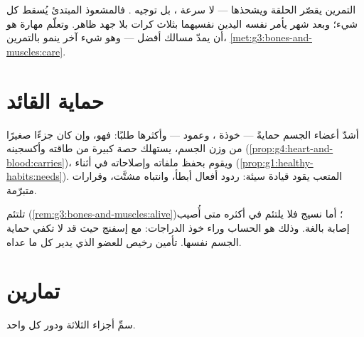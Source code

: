 \begin{remark}\label{rem:g5:brain-in-command:training}
التمرين يقصّر الحلقة ويشحذها --- لا سرعة ، بل توجيه .
فالمشعوذ المبتدئ يُسقط كل شيء؛ وبعد شهر يأمر  نفسه اليدين
نفسيهما بثلاث كرات بلا جهد ظاهر. وتعلّم مهارة هو أن يمدّ 
مسالك أفضل --- وهو شيء آخر ينمو بالتمرين، 
\cref{met:g3:bones-and-muscles:care}.
\end{remark}

\section{حماية القائد}

\begin{proposition}\label{prop:g5:brain-in-command:protect}
 أشدّ أعضاء الجسم حمايةً --- خوذة ، وعمود  --- وأكثرها طلبًا: فهو، وإن كان جزءًا صغيرًا من وزن الجسم،
يستهلك حصة كبيرة من طاقته وأكسجينه
(\cref{prop:g4:heart-and-blood:carries})، ويقوم بحفظ ملفاته
وإصلاحاته في أثناء \emph{}
(\cref{prop:g1:healthy-habits:needs}).  المتعب يقود قيادة
سيئة: ردود أفعال أبطأ، وانتباه مشتَّت، وقرارات متبرّمة.
\end{proposition}
\admitted

\begin{example}\label{ex:g5:brain-in-command:helmet}
 تلتئم (\cref{rem:g3:bones-and-muscles:alive})؛ أما نسيج
 فلا يلتئم في أكثره متى أُصيب إصابة بالغة. وذلك هو الحساب
وراء خوذ الدراجات:  مع إسفنج حيث قد لا تكفي حماية الجسم
نفسها. تأمين رخيص للعضو الذي يدير كل ما عداه.
\end{example}

\section{تمارين}

\begin{exercise}[$\star$]\label{exo:g5:brain-in-command:1}
سمِّ أجزاء  الثلاثة ودور كل واحد.
\end{exercise}

